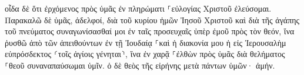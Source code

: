 \documentclass{openreader}
\begin{document}
οἶδα δὲ ὅτι ἐρχόμενος πρὸς ὑμᾶς ἐν πληρώματι ⸀εὐλογίας Χριστοῦ ἐλεύσομαι. 
Παρακαλῶ δὲ ὑμᾶς, ἀδελφοί, διὰ τοῦ κυρίου ἡμῶν Ἰησοῦ Χριστοῦ καὶ διὰ τῆς ἀγάπης τοῦ πνεύματος συναγωνίσασθαί μοι ἐν ταῖς προσευχαῖς ὑπὲρ ἐμοῦ πρὸς τὸν θεόν, 
ἵνα ῥυσθῶ ἀπὸ τῶν ἀπειθούντων ἐν τῇ Ἰουδαίᾳ ⸀καὶ ἡ διακονία μου ἡ εἰς Ἰερουσαλὴμ εὐπρόσδεκτος ⸂τοῖς ἁγίοις γένηται⸃, 
ἵνα ἐν χαρᾷ ⸀ἐλθὼν πρὸς ὑμᾶς διὰ θελήματος ⸀θεοῦ συναναπαύσωμαι ὑμῖν. 
ὁ δὲ θεὸς τῆς εἰρήνης μετὰ πάντων ὑμῶν· ἀμήν. 
\end{document}
